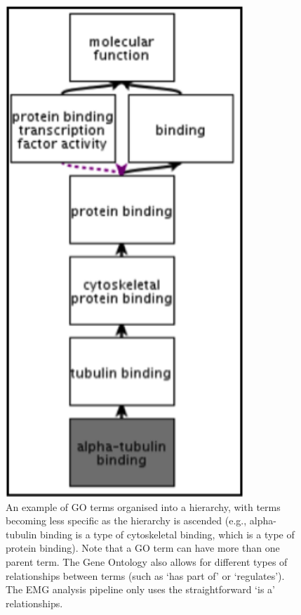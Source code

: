 \begin{figure}[H]
\centering
\includegraphics[width=0.8\textwidth]{handout/GO.png}
\caption{An example of GO terms organised into a hierarchy, with terms becoming less specific as the hierarchy is ascended (e.g., alpha-tubulin binding is a type of cytoskeletal binding, which is a type of protein binding). Note that a GO term can have more than one parent term. The Gene Ontology also allows for different types of relationships between terms (such as ‘has part of’ or ‘regulates’). The EMG analysis pipeline only uses the straightforward ‘is a’ relationships.}
\label{fig:GO}
\end{figure}

